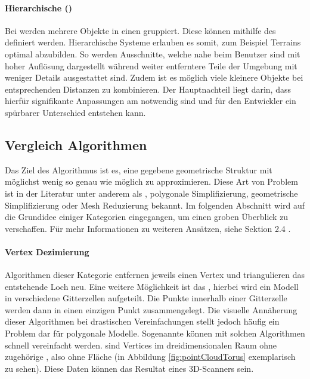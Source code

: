 \paragraph{Hierarchische  ()}
Bei  werden mehrere Objekte in einen  gruppiert. Diese  können mithilfe des  definiert werden.
Hierarchische Systeme erlauben es somit, zum Beispiel Terrains optimal abzubilden. So werden Ausschnitte, welche nahe beim Benutzer sind mit hoher Auflösung dargestellt während weiter entferntere Teile der Umgebung mit weniger Details ausgestattet sind.
Zudem ist es möglich viele kleinere Objekte bei entsprechenden Distanzen zu kombinieren.
Der Hauptnachteil liegt darin, dass hierfür signifikante Anpassungen am  notwendig sind und für den Entwickler ein spürbarer Unterschied entstehen kann.

\subsection{Vergleich Algorithmen}
\label{chap:lodAlgorithmComparison}

Das Ziel des Algorithmus ist es, eine gegebene geometrische Struktur mit möglichst wenig  so genau wie möglich zu approximieren.
Diese Art von Problem ist in der Literatur unter anderem als , polygonale Simplifizierung, geometrische Simplifizierung oder Mesh Reduzierung bekannt.
Im folgenden Abschnitt wird auf die Grundidee einiger Kategorien eingegangen, um einen groben Überblick zu verschaffen.
Für mehr Informationen zu weiteren Ansätzen, siehe  Sektion 2.4 \cite{quadridBasedSurfaceSimplification}.

\paragraph{Vertex Dezimierung}
Algorithmen dieser Kategorie entfernen jeweils einen Vertex und triangulieren das entstehende Loch neu.
Eine weitere Möglichkeit ist das , hierbei wird ein Modell in verschiedene Gitterzellen aufgeteilt. Die Punkte innerhalb einer Gitterzelle werden dann in einen einzigen Punkt zusammengelegt. Die visuelle Annäherung dieser Algorithmen bei drastischen Vereinfachungen stellt jedoch häufig ein Problem dar für polygonale Modelle. Sogenannte  können mit solchen Algorithmen schnell vereinfacht werden.
 sind Vertices im dreidimensionalen Raum ohne zugehörige , also ohne Fläche (in Abbildung \ref{fig:pointCloudTorus} exemplarisch zu sehen). Diese Daten können das Resultat eines 3D-Scanners sein.

